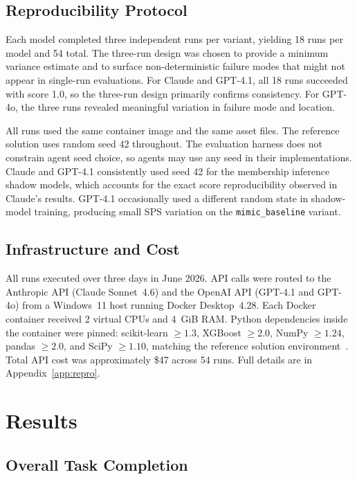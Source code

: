 \documentclass[11pt]{article}
\begin{document}
\subsection{Reproducibility Protocol}

Each model completed three independent runs per variant, yielding 18 runs per
model and 54 total. The three-run design was chosen to provide a minimum
variance estimate and to surface non-deterministic failure modes that might
not appear in single-run evaluations. For Claude and GPT-4.1, all 18 runs
succeeded with score 1.0, so the three-run design primarily confirms
consistency. For GPT-4o, the three runs revealed meaningful variation in
failure mode and location.

All runs used the same container image and the same asset files. The reference
solution uses random seed 42 throughout. The evaluation harness does not
constrain agent seed choice, so agents may use any seed in their implementations.
Claude and GPT-4.1 consistently used seed 42 for the membership inference
shadow models, which accounts for the exact score reproducibility observed
in Claude's results. GPT-4.1 occasionally used a different random state in
shadow-model training, producing small SPS variation on the
\texttt{mimic\_baseline} variant.

\subsection{Infrastructure and Cost}

All runs executed over three days in June 2026. API calls were routed to the
Anthropic API (Claude Sonnet~4.6) and the OpenAI API (GPT-4.1 and GPT-4o)
from a Windows~11 host running Docker Desktop~4.28. Each Docker container
received 2 virtual CPUs and 4~GiB RAM. Python dependencies inside the
container were pinned: scikit-learn $\geq 1.3$, XGBoost $\geq 2.0$,
NumPy $\geq 1.24$, pandas $\geq 2.0$, and SciPy $\geq 1.10$, matching the
reference solution environment~\citep{pedregosa2011scikit,chen2016xgboost}.
Total API cost was approximately \$47 across 54 runs. Full details are in
Appendix~\ref{app:repro}.

\section{Results}
\label{sec:results}

\subsection{Overall Task Completion}
\end{document}
